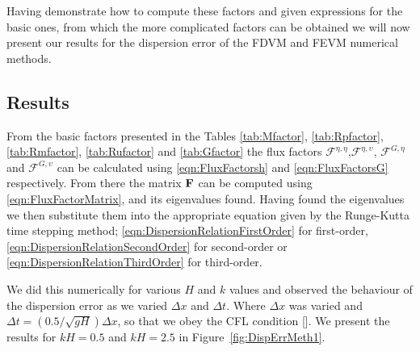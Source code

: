 Having demonstrate how to compute these factors and given expressions for the basic ones, from which the more complicated factors can be obtained we will now present our results for the dispersion error of the FDVM and FEVM numerical methods.

\subsection{Results}
From the basic factors presented in the Tables \ref{tab:Mfactor}, \ref{tab:Rpfactor}, \ref{tab:Rmfactor}, \ref{tab:Rufactor} and \ref{tab:Gfactor} the flux factors $\mathcal{F}^{\eta,\eta}$,$\mathcal{F}^{\eta,\upsilon}$, $\mathcal{F}^{G,\eta}$ and $\mathcal{F}^{G,\upsilon}$
can be calculated using \eqref{eqn:FluxFactorsh} and \eqref{eqn:FluxFactorsG} respectively. From there the matrix $\mathbf{F}$ can be computed using \eqref{eqn:FluxFactorMatrix}, and its eigenvalues found. Having found the eigenvalues we then substitute them into the appropriate equation given by the Runge-Kutta time stepping method; \eqref{eqn:DispersionRelationFirstOrder} for first-order, \eqref{eqn:DispersionRelationSecondOrder} for second-order or \eqref{eqn:DispersionRelationThirdOrder} for third-order. 

We did this numerically for various $H$ and $k$ values and observed the behaviour of the dispersion error as we varied $\Delta x$ and $\Delta t$. Where $\Delta x$ was varied and $\Delta t =   \left( 0.5 / \sqrt{gH} \right) {\Delta x} $, so that we obey the CFL condition []. We present the results for $kH = 0.5$ and $kH = 2.5$ in Figure~\ref{fig:DispErrMeth1}.

